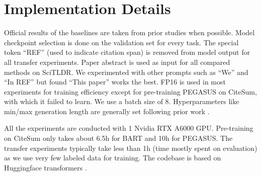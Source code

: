 \documentclass[11pt]{article}
\newcommand{\ourdata}{CiteSum\xspace}
\begin{document}
\section{Implementation Details}
\label{sec_implement}
Official results of the baselines are taken from prior studies when possible.
Model checkpoint selection is done on the validation set for every task.
The special token ``REF'' (used to indicate citation span) is removed from model output for all transfer experiments.
Paper abstract is used as input for all compared methods on SciTLDR.
We experimented with other prompts such as ``We'' and ``In REF'' but found ``This paper'' works the best.
FP16 is used in most experiments for training efficiency except for pre-training PEGASUS on \ourdata, with which it failed to learn. We use a batch size of 8. Hyperparameters like min/max generation length are generally set following prior work \cite{zhang2020pegasus}.

All the experiments are conducted with 1 Nvidia RTX A6000 GPU.
Pre-training on \ourdata only takes about 6.5h for BART and 10h for PEGASUS. 
The transfer experiments typically take less than 1h (time mostly spent on evaluation) as we use very few labeled data for training.
The codebase is based on Huggingface transformers \cite{wolf-etal-2020-transformers}.
\end{document}
